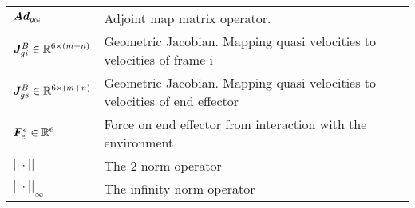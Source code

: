 \begin{longtable}{p{6cm}p{10cm}}
			$ \boldsymbol{Ad}_{g_{0i}}$ & Adjoint map matrix operator. \\
			$\boldsymbol J_{gi}^B \in \mathbb{R}^{6 \times (m+n)}$ & Geometric Jacobian. Mapping quasi velocities to velocities of frame \frame i\\
			$\boldsymbol J_{ge}^B \in \mathbb{R}^{6 \times (m+n)}$ & Geometric Jacobian. Mapping quasi velocities to velocities of end effector\\
			$\boldsymbol F_{e}^{e} \in \mathbb{R}^{6} $ & Force on end effector from interaction with the environment \\
			$|| \cdot ||$ & The 2 norm operator	 \\
			$|| \cdot ||_{\infty} $ & The infinity norm operator	



			
			

    \end{longtable}




\clearpage
